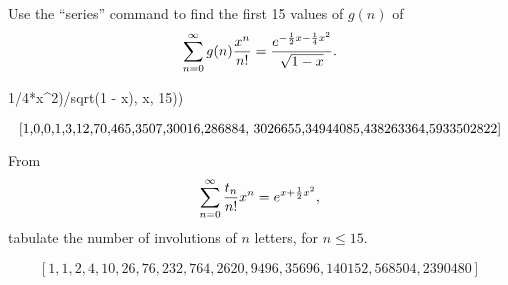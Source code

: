 \begin{exercise}
    Use the ``series'' command to find the first 15 values of $g(n)$ of
    \[
        \bsum[n] g(n)\expcoeff = \frac{e^{-\frac12x-\frac14x^2}}{\sqrt{1-x}}.
    \]
\end{exercise}
\begin{solution}
\begin{mapleinput}
  1/4*x^2)/sqrt(1 - x), x, 15))
\end{mapleinput}
\begin{mapleoutput}
    \[
        \resizebox{\hsize}{!}{[1,0,0,1,3,12,70,465,3507,30016,286884, 3026655,34944085,438263364,5933502822]}
    \]
\end{mapleoutput}
\end{solution}

\begin{exercise}
    From
    \[
        \bsum[n] \frac{t_n}{n!}x^n = e^{x+\frac12 x^2},
    \]
    tabulate the number of involutions of $n$ letters, for $n \leq 15$.
\end{exercise}
\begin{solution}
\begin{mapleinput}
\end{mapleinput}
\begin{mapleoutput}
    \[
        [1, 1, 2, 4, 10, 26, 76, 232, 764, 2620, 9496, 35696, 140152, 568504, 2390480]
    \]  
\end{mapleoutput}
\end{solution}

